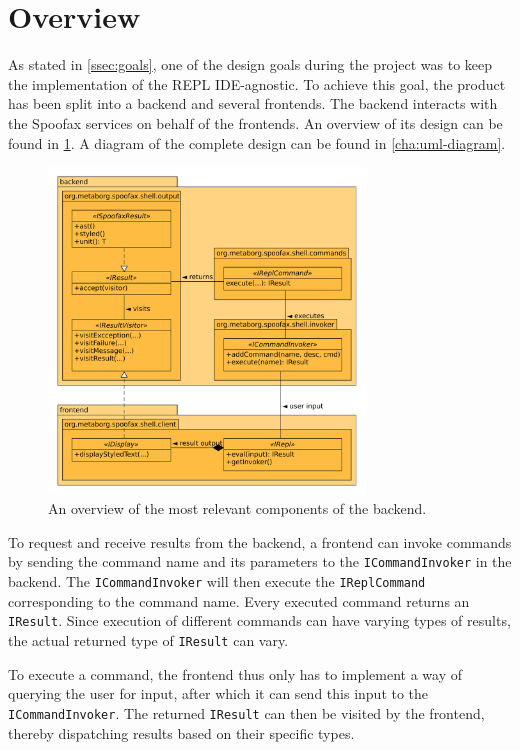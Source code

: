 \section{Overview}
\label{sec:overview}

As stated in \cref{ssec:goals}, one of the design goals during the project was
to keep the implementation of the REPL IDE-agnostic. To achieve this goal, the
product has been split into a backend and several frontends. The backend
interacts with the Spoofax services on behalf of the frontends. An overview of
its design can be found in \cref{fig:uml-overview}. A diagram of the complete
design can be found in \cref{cha:uml-diagram}.

\begin{figure}[h!]
  \centering
  \includegraphics[width=0.75\textwidth]{uml-overview}
  \caption{An overview of the most relevant components of the backend.}
  \label{fig:uml-overview}
\end{figure}

To request and receive results from the backend, a frontend can invoke commands
by sending the command name and its parameters to the \texttt{ICommandInvoker}
in the backend. The \texttt{ICommandInvoker} will then execute the
\texttt{IReplCommand} corresponding to the command name. Every executed command
returns an \texttt{IResult}. Since execution of different commands can have
varying types of results, the actual returned type of \texttt{IResult} can
vary.

To execute a command, the frontend thus only has to implement a way of querying
the user for input, after which it can send this input to the
\texttt{ICommandInvoker}. The returned \texttt{IResult} can then be visited
by the frontend, thereby dispatching results based on their specific types.


